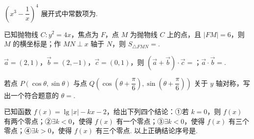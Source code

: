 \documentclass[a4paper,11pt]{report}
\begin{document}
\begin{examquestions}[start=11]
\item $(x^3-\dfrac1x)^4$ 展开式中常数项为\blank.
\item 已知抛物线 $C:y^2=4x$，焦点为 $F$，点 $M$ 为抛物线 $C$ 上的点，且 $|FM|=6$，则 $M$ 的横坐标是\blank；作 $MN\perp x$ 轴于 $N$，则 $S_{\triangle FMN}=$\blank.
\item $\vec a=(2,1)$，$\vec b=(2,-1)$，$\vec c=(0,1)$，则 $(\vec a+\vec b)\cdot\vec c=$\blank；$\vec a\cdot\vec b=$\blank.
\item 若点 $P(\cos\theta,\sin\theta)$ 与点 $Q(\cos(\theta+\dfrac\pi6),\sin(\theta+\dfrac\pi6))$ 关于 $y$ 轴对称，写出一个符合题意的 $\theta=$\blank.
\item 已知函数 $f(x)=\lg|x|-kx-2$，给出下列四个结论：①若 $k=0$，则 $f(x)$ 有两个零点；②$\exists k<0$，使得 $f(x)$ 有一个零点；③$\exists k<0$，使得 $f(x)$ 有三个零点；④$\exists k>0$，使得 $f(x)$ 有三个零点. 以上正确结论序号是\blank.
\end{examquestions}
\newpage
{}
\end{document}
